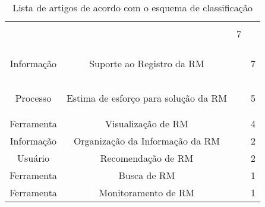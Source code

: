 \begin{table}[htbp]
{\begin{tabular}{|c|c|l|c|}
&~\cite{Bangcharoensap:2012:LSC:2419061.2419428,corley2011recovering,Nguyen:2012:MAR:2393596.2393671}      & \multirow{3}{*}{7}  \\
                              &
                              &~\cite{Thung:2014:BIT:2635868.2661678,Wong:2014:BBF:2705615.2706096}                                      &                     \\
                              &
                              &~\cite{Romo:2015:TAT:2745802.2745833,thung2013automatic}                                                  &                     \\ \hline
\multirow{2}{*}{Informação}   & \multirow{2}{*}{Suporte ao Registro da RM}    &~\cite{zimmermann2010makes, Correa2013b,moran2015auto,Moran:2015:EAA:2786805.2807557}                          & \multirow{2}{*}{7}  \\
                              &
                              &~\cite{Tu:2014:MQI:2677832.2677844,White:2015:GRR:2820282.2820291,Wu2011a}                                &                     \\ \hline
\multirow{2}{*}{Processo}     & \multirow{2}{*}{Estima de esforço para solução
    da RM}      &~\cite{Bhattacharya:2011:BTP:1985441.1985472,Nagwani2010,thung2012would}                                  & \multirow{2}{*}{5}  \\
                              &
                              &~\cite{Vijayakumar2014,xia2015automatic}                                                                  &                     \\ \hline
Ferramenta                    & Visualização de RM
&~\cite{dal2013closer,dal2014bug,hora2012bug,takama2013application}                                        & 4                   \\ \hline
Informação                    & Organização da Informação da RM
&~\cite{mani2012ausum,otoom2016severity}                                                                   & 2                   \\ \hline
Usuário                       & Recomendação de RM
&~\cite{malheiros2012source,Wang2011bug}                                                                   & 2                   \\ \hline
Ferramenta                   & Busca de RM                                   &~\cite{liu2014faceted}                                                                                    & 1                   \\ \hline
Ferramenta                    & Monitoramento de RM                           &~\cite{Aggarwal:2014:MIT:2593801.2593810}                                                                 & 1                   \\ \hline
\end{tabular}%
}
\caption{Lista de artigos de acordo com o esquema de classificação}\label{tab:taxonomia-problemas-manutencao}
\end{table}
